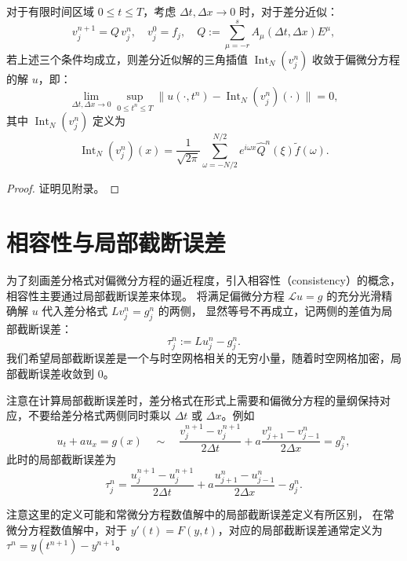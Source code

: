 \begin{theorem}\label{thm:big-thm}
    对于有限时间区域 $0 \le t \le T$，考虑 $\Delta t,\Delta x \to 0$ 时，对于差分近似：
    \[
        v_j^{n+1} = Q\,v_j^n,\quad v_j^0 = f_j,\quad Q := \sum_{\mu = -r}^s A_\mu(\Delta t, \Delta x) E^\mu,
    \]
    若上述三个条件均成立，则差分近似解的三角插值 $\operatorname{Int}_N (v_j^n)$ 收敛于偏微分方程的解 $u$，即：
    \[
        \lim_{\Delta t, \Delta x \to 0} \sup_{0 \le t^n \le T} \| u(\cdot,t^n) - \operatorname{Int}_N (v_j^n)(\cdot) \| = 0,
    \]
    其中 $\operatorname{Int}_N (v_j^n)$ 定义为
    \[
        \operatorname{Int}_N (v_j^n)(x)  = \frac{1}{\sqrt{2\pi}} \sum_{\omega = -N/2}^{N/2} e^{i \omega  x} \widehat{Q}^n(\xi) \tilde{f}(\omega ).
    \]
\end{theorem}

\begin{proof}
    证明见附录。
\end{proof}

\section{相容性与局部截断误差}

为了刻画差分格式对偏微分方程的逼近程度，引入相容性（consistency）的概念，相容性主要通过局部截断误差来体现。
将满足偏微分方程 $\mathcal{L} u = g$ 的充分光滑精确解 $u$ 代入差分格式 $L v_j^n = g_j^n$ 的两侧，
显然等号不再成立，记两侧的差值为局部截断误差：
\[
    \tau_j^n := L u_j^n - g_j^n.
\]
我们希望局部截断误差是一个与时空网格相关的无穷小量，随着时空网格加密，局部截断误差收敛到 $0$。

注意在计算局部截断误差时，差分格式在形式上需要和偏微分方程的量纲保持对应，不要给差分格式两侧同时乘以 $\Delta t$ 或 $\Delta x$。例如
\[
    u_t + a u_x = g(x)
    \quad \sim \quad
    \frac{v_j^{n+1}-v_j^{n+1}}{2\Delta t} + a \frac{v_{j+1}^n-v_{j-1}^n}{2\Delta x} = g_j^n,
\]
此时的局部截断误差为
\[
    \tau_j^n = \frac{u_j^{n+1}-u_j^{n+1}}{2\Delta t} + a \frac{u_{j+1}^n-u_{j-1}^n}{2\Delta x} - g_j^n.
\]

\begin{remark}
    注意这里的定义可能和常微分方程数值解中的局部截断误差定义有所区别，
    在常微分方程数值解中，对于 $y'(t) = F(y,t)$，对应的局部截断误差通常定义为 $\tau^n = y(t^{n+1}) - y^{n+1}$。
\end{remark}

